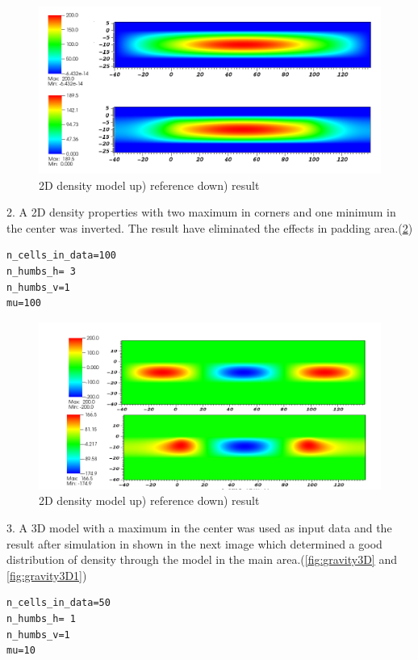 \begin{figure}
\centering
\includegraphics[width=\textwidth]{grav2D1.png}
\caption{2D density model up) reference    down) result}
\label{fig:gravity2D1}
\end{figure}


2. A 2D density properties with two maximum in corners and one minimum in the center was inverted. The result have eliminated the effects in padding area.(\ref{fig:gravity2D3}) 

\begin{verbatim}
n_cells_in_data=100
n_humbs_h= 3
n_humbs_v=1
mu=100
\end{verbatim}

\begin{figure}
\centering
\includegraphics[width=\textwidth]{grav2D3.png}
\caption{2D density model up) reference  down) result}
\label{fig:gravity2D3}
\end{figure}

3. A 3D model with a maximum in the center was used as input data and the result after simulation in shown in the next image which determined a good distribution of density through the model in the main area.(\ref{fig:gravity3D} and \ref{fig:gravity3D1})

\begin{verbatim}
n_cells_in_data=50
n_humbs_h= 1
n_humbs_v=1
mu=10
\end{verbatim}

